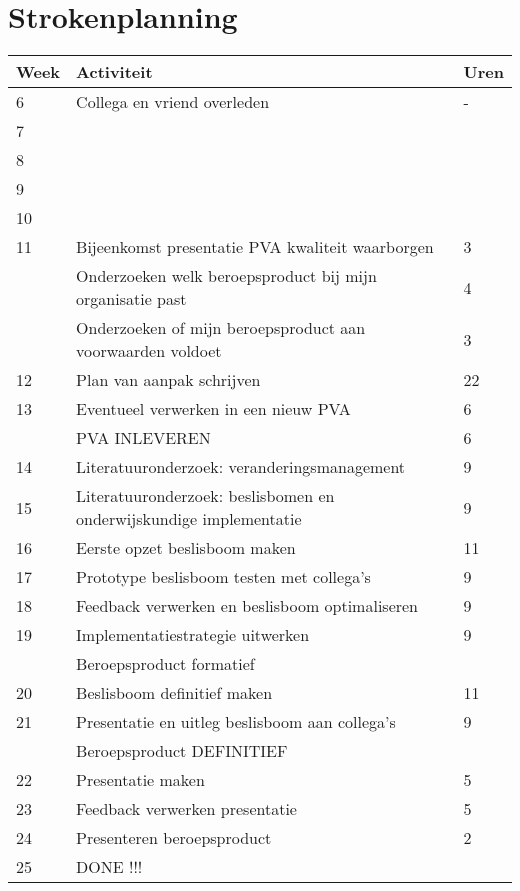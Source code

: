  \section{Strokenplanning}
 \begin{tabular}{|l|p{10cm}|l|}
    \hline
    Week & Activiteit & Uren \\
    \hline
    6  & Collega en vriend overleden & - \\
    7  &  &  \\
    8  &  &  \\
    9  &  &  \\
    10 &  &  \\
    11 & Bijeenkomst presentatie PVA kwaliteit waarborgen & 3 \\
       & Onderzoeken welk beroepsproduct bij mijn organisatie past & 4 \\
       & Onderzoeken of mijn beroepsproduct aan voorwaarden voldoet & 3 \\
    12 & Plan van aanpak schrijven & 22 \\
    13 & Eventueel verwerken in een nieuw PVA & 6 \\
       & PVA INLEVEREN & 6 \\
    14 & Literatuuronderzoek: veranderingsmanagement & 9 \\
    15 & Literatuuronderzoek: beslisbomen en onderwijskundige implementatie & 9 \\
    16 & Eerste opzet beslisboom maken & 11 \\
    17 & Prototype beslisboom testen met collega’s & 9 \\
    18 & Feedback verwerken en beslisboom optimaliseren & 9 \\
    19 & Implementatiestrategie uitwerken & 9 \\
       & Beroepsproduct formatief &   \\
    20 & Beslisboom definitief maken & 11 \\
    21 & Presentatie en uitleg beslisboom aan collega’s & 9 \\
       & Beroepsproduct DEFINITIEF & \\
    22 & Presentatie maken & 5 \\
    23 & Feedback verwerken presentatie & 5 \\
    24 & Presenteren beroepsproduct & 2 \\
    25 & DONE !!! & \\

    \hline
\end{tabular}

